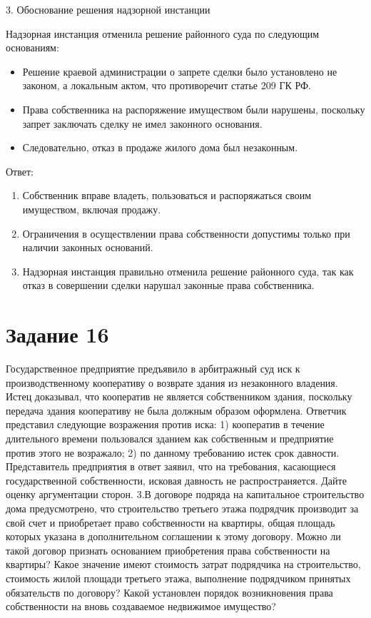 \documentclass[14pt,a4paper]{extarticle}
\begin{document}
3. Обоснование решения надзорной инстанции

Надзорная инстанция отменила решение районного суда по следующим основаниям:

\begin{itemize}
    \item Решение краевой администрации о запрете сделки было установлено не законом, а локальным актом, что противоречит статье 209 ГК РФ.
    \item Права собственника на распоряжение имуществом были нарушены, поскольку запрет заключать сделку не имел законного основания.
    \item Следовательно, отказ в продаже жилого дома был незаконным.
\end{itemize}

Ответ:

\begin{enumerate}
    \item Собственник вправе владеть, пользоваться и распоряжаться своим имуществом, включая продажу.
    \item Ограничения в осуществлении права собственности допустимы только при наличии законных оснований.
    \item Надзорная инстанция правильно отменила решение районного суда, так как отказ в совершении сделки нарушал законные права собственника.
\end{enumerate}

\section{Задание 16}
Государственное предприятие предъявило в арбитражный суд иск к
производственному кооперативу о возврате здания из незаконного владения. Истец
доказывал, что кооператив не является собственником здания, поскольку передача здания
кооперативу не была должным образом оформлена.
Ответчик представил следующие возражения против иска:
1) кооператив в течение длительного времени пользовался зданием как собственным
и предприятие против этого не возражало;
2) по данному требованию истек срок давности. Представитель предприятия в ответ
заявил, что на требования, касающиеся государственной собственности, исковая давность
не распространяется. Дайте оценку аргументации сторон.
3.В договоре подряда на капитальное строительство дома предусмотрено, что
строительство третьего этажа подрядчик производит за свой счет и приобретает право
собственности на квартиры, общая площадь которых указана в дополнительном
соглашении к этому договору.
Можно ли такой договор признать основанием приобретения права собственности
на квартиры? Какое значение имеют стоимость затрат подрядчика на строительство,
стоимость жилой площади третьего этажа, выполнение подрядчиком принятых
обязательств по договору? Какой установлен порядок возникновения права собственности
на вновь создаваемое недвижимое имущество?
\end{document}
